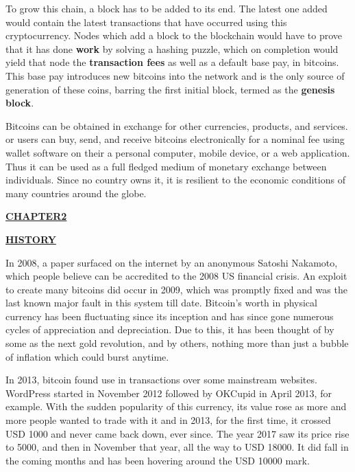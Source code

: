 \documentclass[12pt,a4paper]{report}
\begin{document}
\begin{justify}
\begin{figure}[h]
\end{figure}

\vspace{10mm}

To grow this chain, a block has to be added to its end. The latest one added would contain the latest transactions that have occurred using this cryptocurrency. Nodes which add a block to the blockchain would have to prove that it has done \textbf{work} by solving a hashing puzzle, which on completion would yield that node the \textbf{transaction fees} as well as a default base pay, in bitcoins. This base pay introduces new bitcoins into the network and is the only source of generation of these coins, barring the first initial block, termed as the \textbf{genesis block}.
\vspace{10mm}

Bitcoins can be obtained in exchange for other currencies, products, and services. or users can buy, send, and receive bitcoins electronically for a nominal fee using wallet software on their a personal computer, mobile device, or a web application.
Thus it can be used as a full fledged medium of monetary exchange between individuals. Since no country owns it, it is resilient to the economic conditions of many countries around the globe.

\newpage
\begin{center}\underline{  \Large\textbf{CHAPTER2}}\end{center}
\begin{center}\underline{ \Large \textbf{HISTORY}}\end{center}


\vspace{10mm}

In 2008, a paper surfaced on the internet by an anonymous Satoshi Nakamoto, which people believe can be accredited to the 2008 US financial crisis. An exploit to create many bitcoins did occur in 2009, which was promptly fixed and was the last known major fault in this system till date. Bitcoin's worth in physical currency has been fluctuating since its inception and has since gone numerous cycles of appreciation and depreciation.
Due to this, it has been thought of by some as the next gold revolution, and by others, nothing more than just a bubble of inflation which could burst anytime.
\vspace{5mm}

In 2013, bitcoin found use in transactions over some mainstream websites. WordPress started in November 2012 followed by OKCupid in April 2013, for example.
With the sudden popularity of this currency, its value rose as more and more people wanted to trade with it and in 2013, for the first time, it crossed USD 1000 and never came back down, ever since. The year 2017 saw its price rise to 5000, and then in November that year, all the way to USD 18000. It did fall in the coming months and has been hovering around the USD 10000 mark.



\end{justify}
\end{document}
